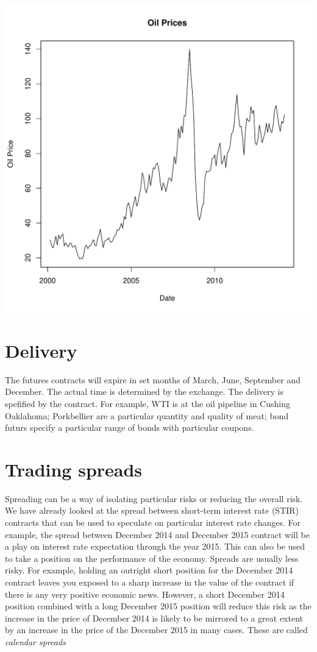 \documentclass[12pt, a4paper, oneside]{article}\usepackage{graphicx, color}
\makeatletter
\def\maxwidth{ %
  \ifdim\Gin@nat@width>\linewidth
    \linewidth
  \else
    \Gin@nat@width
  \fi
}
\newenvironment{knitrout}{}{} %
\makeatother
\begin{document}
\begin{knitrout}
\color{fgcolor}
\includegraphics[width=\maxwidth]{figure/oilprice} 

\end{knitrout}


\section*{Delivery}
The futures contracts will expire in set months of March, June, September and December.  The actual time is determined by the exchange. The delivery is spefified by the contract.  For example, WTI is at the oil pipeline in Cushing Oaklahoma; Porkbellier are a particular quantity and quality of meat; bond futurs specify a particular range of bonds with particular coupons. 

\section*{Trading spreads}
Spreading can be a way of isolating particular risks or reducing the overall risk.  We have already looked at the spread between short-term interest rate (STIR) contracts that can be used to speculate on particular interest rate changes.  For example, the spread between December 2014 and December 2015 contract will be a play on interest rate expectation through the year 2015.  This can also be used to take a position on the performance of the economy.  Spreads are usually less risky.  For example, holding an outright short position for the December 2014 contract leaves you exposed to a sharp increase in the  value of the contract if there is any very positive economic news.  However, a short December 2014 position combined with  a long December 2015 position will reduce this risk as the increase in the price of December 2014 is likely to be mirrored to a great extent by an increase in the price of the December 2015 in many cases.  These are called \emph{calendar spreads}
\end{document}
